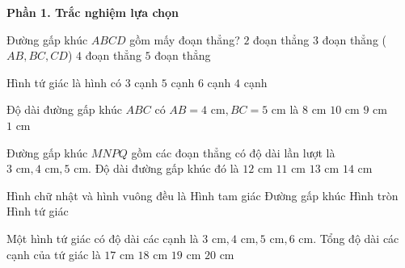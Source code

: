 \textbf{Phần 1. Trắc nghiệm lựa chọn}

\begin{ex} %
Đường gấp khúc $ABCD$ gồm mấy đoạn thẳng?
\choice
{$2$ đoạn thẳng}
{\True $3$ đoạn thẳng ($AB, BC, CD$)}
{$4$ đoạn thẳng}
{$5$ đoạn thẳng}
\end{ex}

\begin{ex} %
Hình tứ giác là hình có
\choice
{$3$ cạnh}
{$5$ cạnh}
{$6$ cạnh}
{\True $4$ cạnh}
\end{ex}

\begin{ex} %
Độ dài đường gấp khúc $ABC$ có $AB = 4\text{ cm}, BC = 5\text{ cm}$ là
\choice
{$8\text{ cm}$}
{$10\text{ cm}$}
{\True $9\text{ cm}$}
{$1\text{ cm}$}
\end{ex}

\begin{ex} %
Đường gấp khúc $MNPQ$ gồm các đoạn thẳng có độ dài lần lượt là $3\text{ cm}, 4\text{ cm}, 5\text{ cm}$. Độ dài đường gấp khúc đó là
\choice
{\True $12\text{ cm}$}
{$11\text{ cm}$}
{$13\text{ cm}$}
{$14\text{ cm}$}
\end{ex}

\begin{ex} %
Hình chữ nhật và hình vuông đều là
\choice
{Hình tam giác}
{Đường gấp khúc}
{Hình tròn}
{\True Hình tứ giác}
\end{ex}

\begin{ex} %
Một hình tứ giác có độ dài các cạnh là $3\text{ cm}, 4\text{ cm}, 5\text{ cm}, 6\text{ cm}$. Tổng độ dài các cạnh của tứ giác là
\choice
{$17\text{ cm}$}
{\True $18\text{ cm}$}
{$19\text{ cm}$}
{$20\text{ cm}$}
\end{ex}

